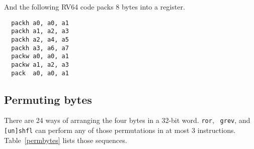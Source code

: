 And the following RV64 code packs 8 bytes into a register.

\begin{minipage}{\linewidth}
\begin{verbatim}
  packh a0, a0, a1
  packh a1, a2, a3
  packh a2, a4, a5
  packh a3, a6, a7
  packw a0, a0, a1
  packw a1, a2, a3
  pack  a0, a0, a1
\end{verbatim}
\end{minipage}


\subsection{Permuting bytes}

There are 24 ways of arranging the four bytes in a 32-bit word. {\tt ror}, {\tt
grev}, and {\tt [un]shfl} can perform any of those permutations in at most 3
instructions. Table~\ref{permbytes} lists those sequences.~\cite{Wolf19A}

